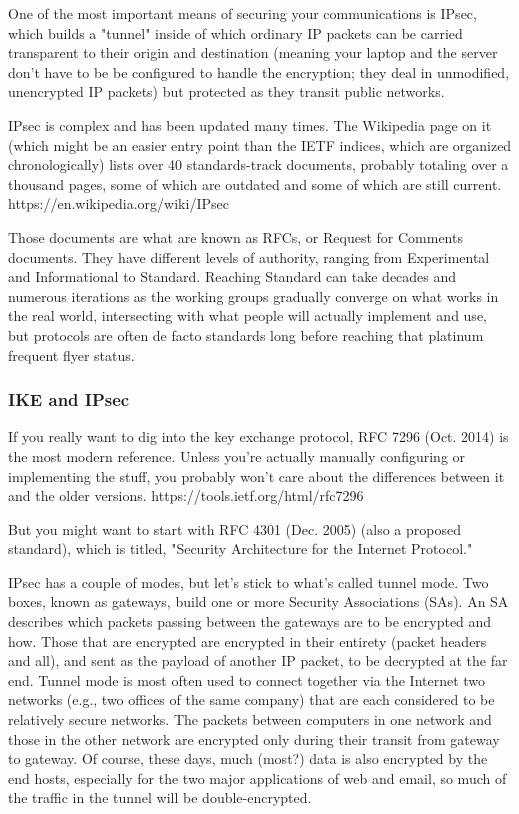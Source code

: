 \documentclass[%
 aip,
 jmp,%
 amsmath,amssymb,
 reprint,%
]{revtex4-1}
\begin{document}
One of the most important means of securing your communications is
IPsec, which builds a "tunnel" inside of which ordinary IP packets can
be carried transparent to their origin and destination (meaning your
laptop and the server don't have to be be configured to handle the
encryption; they deal in unmodified, unencrypted IP packets) but
protected as they transit public networks.

IPsec is complex and has been updated many times.  The Wikipedia page
on it (which might be an easier entry point than the IETF indices,
which are organized chronologically) lists over 40 standards-track
documents, probably totaling over a thousand pages, some of which are
outdated and some of which are still current.
https://en.wikipedia.org/wiki/IPsec

Those documents are what are known as RFCs, or Request for Comments
documents.  They have different levels of authority, ranging from
Experimental and Informational to Standard.  Reaching Standard can
take decades and numerous iterations as the working groups gradually
converge on what works in the real world, intersecting with what
people will actually implement and use, but protocols are often de
facto standards long before reaching that platinum frequent flyer
status.

\subsubsection{IKE and IPsec}

If you really want to dig into the key exchange protocol, RFC 7296
(Oct. 2014) is the most modern reference.  Unless you're actually
manually configuring or implementing the stuff, you probably won't
care about the differences between it and the older versions.
https://tools.ietf.org/html/rfc7296

But you might want to start with RFC 4301 (Dec. 2005) (also a proposed
standard), which is titled, "Security Architecture for the Internet
Protocol."

IPsec has a couple of modes, but let's stick to what's called tunnel
mode.  Two boxes, known as gateways, build one or more Security
Associations (SAs). An SA describes which packets passing between the
gateways are to be encrypted and how.  Those that are encrypted are
encrypted in their entirety (packet headers and all), and sent as the
payload of another IP packet, to be decrypted at the far end.  Tunnel
mode is most often used to connect together via the Internet two
networks (e.g., two offices of the same company) that are each
considered to be relatively secure networks.  The packets between
computers in one network and those in the other network are encrypted
only during their transit from gateway to gateway.  Of course, these
days, much (most?) data is also encrypted by the end hosts, especially
for the two major applications of web and email, so much of the
traffic in the tunnel will be double-encrypted.
\end{document}
